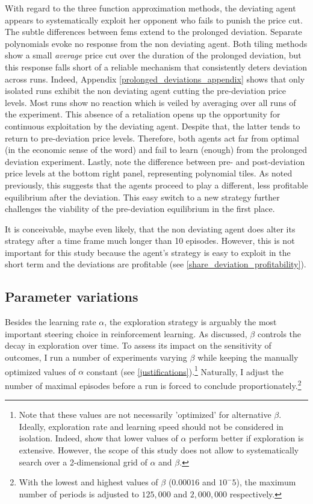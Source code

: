 With regard to the three function approximation methods, the deviating agent appears to systematically exploit her opponent who fails to punish the price cut. The subtle differences between \gls{fem}s extend to the prolonged deviation. Separate polynomials evoke no response from the non deviating agent. Both tiling methods show a small \emph{average} price cut over the duration of the prolonged deviation, but this response falls short of a reliable mechanism that consistently deters deviation across runs. Indeed, Appendix \ref{prolonged_deviations_appendix} shows that only isolated runs exhibit the non deviating agent cutting the pre-deviation price levels. Most runs show no reaction which is veiled by averaging over all runs of the experiment. This absence of a retaliation opens up the opportunity for continuous exploitation by the deviating agent. Despite that, the latter tends to return to pre-deviation price levels. Therefore, both agents act far from optimal (in the economic sense of the word) and fail to learn (enough) from the prolonged deviation experiment. Lastly, note the difference between pre- and post-deviation price levels at the bottom right panel, representing polynomial tiles. As noted previously, this suggests that the agents proceed to play a different, less profitable equilibrium after the deviation. This easy switch to a new strategy further challenges the viability of the pre-deviation equilibrium in the first place.

It is conceivable, maybe even likely, that the non deviating agent does alter its strategy after a time frame much longer than 10 episodes. However, this is not important for this study because the agent's strategy is easy to exploit in the short term and the deviations are profitable (see \autoref{share_deviation_profitability}).


\subsection{Parameter variations}\label{vary_parameter}

Besides the learning rate $\alpha$, the exploration strategy is arguably the most important steering choice in reinforcement learning. As discussed, $\beta$ controls the decay in exploration over time. To assess its impact on the sensitivity of outcomes, I run a number of experiments varying $\beta$ while keeping the manually optimized values of $\alpha$ constant (see \autoref{justifications}).\footnote{Note that these values are not necessarily 'optimized' for alternative $\beta$. Ideally, exploration rate and learning speed should not be considered in isolation. Indeed, \textcite{calvano_algorithmic_2018} show that lower values of $\alpha$ perform better if exploration is extensive. However, the scope of this study does not allow to systematically search over a 2-dimensional grid of $\alpha$ and $\beta$.} Naturally, I adjust the number of maximal episodes before a run is forced to conclude proportionately.\footnote{With the lowest and highest values of $\beta$ ($0.00016$ and $10^-{5}$), the maximum number of periods is adjusted to $125,000$ and $2,000,000$ respectively.}

